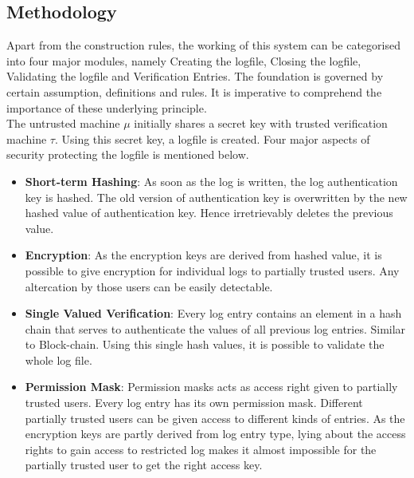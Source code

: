\documentclass[12pt, letter]{article}
\begin{document}
\subsection{Methodology}

Apart from the construction rules, the working of this system can be categorised into four major modules, namely Creating the logfile, Closing the logfile, Validating the logfile and Verification Entries. The foundation is governed by certain assumption, definitions and rules. It is imperative to comprehend the importance of these underlying principle.\\


The untrusted machine $\mu$ initially shares a secret key with trusted verification machine $\tau$. Using this secret key, a logfile is created. Four major aspects of security protecting the logfile is mentioned below.

\begin{itemize}
    \item \textbf{Short-term Hashing}: As soon as the log is written, the log authentication key is hashed. The old version of authentication key is overwritten by the new hashed value of authentication key. Hence irretrievably deletes the previous value.
    
    \item \textbf{Encryption}: As the encryption keys are derived from hashed value, it is possible to give encryption for individual logs to partially trusted users. Any altercation by those users can be easily detectable.
    
    \item \textbf{Single Valued Verification}: Every log entry contains an element in a hash chain that serves to authenticate the values of all previous log entries. Similar to Block-chain. Using this single hash values, it is possible to validate the whole log file.
    
    \item \textbf{Permission Mask}: Permission masks acts as access right given to partially trusted users. Every log entry has its own permission mask. Different partially trusted users can be given access to different kinds of entries. As the encryption keys are partly derived from log entry type, lying about the access rights to gain access to restricted log makes it almost impossible for the partially trusted user to get the right access key.
    
\end{itemize}
\end{document}
